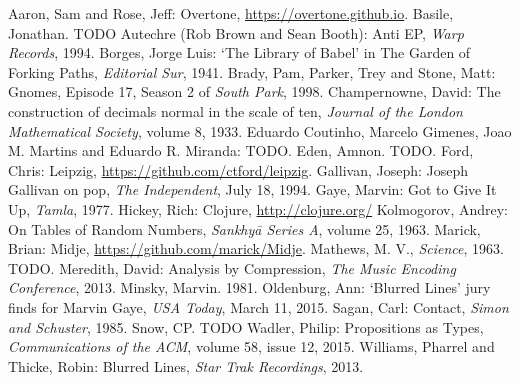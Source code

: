 \documentclass[numbers]{sigplanconf}
\begin{document}
\begin{thebibliography}{}
\softraggedright

 Aaron, Sam and Rose, Jeff: Overtone, \url{https://overtone.github.io}.
 Basile, Jonathan. TODO
 Autechre (Rob Brown and Sean Booth): Anti EP, \textit{Warp Records}, 1994.
 Borges, Jorge Luis: `The Library of Babel' in The Garden of Forking Paths, \textit{Editorial Sur}, 1941.
 Brady, Pam, Parker, Trey and Stone, Matt: Gnomes, Episode 17, Season 2 of \textit{South Park}, 1998.
 Champernowne, David: The construction of decimals normal in the scale of ten, \textit{Journal of the London Mathematical Society}, volume 8, 1933.
 Eduardo Coutinho, Marcelo Gimenes, Joao M. Martins and Eduardo R. Miranda: TODO. 
 Eden, Amnon. TODO.
 Ford, Chris: Leipzig, \url{https://github.com/ctford/leipzig}.
 Gallivan, Joseph: Joseph Gallivan on pop, \textit{The Independent}, July 18, 1994.
 Gaye, Marvin: Got to Give It Up, \textit{Tamla}, 1977.
 Hickey, Rich: Clojure, \url{http://clojure.org/}
  Kolmogorov, Andrey: On Tables of Random Numbers, \textit{Sankhyā Series A}, volume 25, 1963.
 Marick, Brian: Midje, \url{https://github.com/marick/Midje}.
 Mathews, M. V., \textit{Science}, 1963. TODO.
 Meredith, David: Analysis by Compression, \textit{The Music Encoding Conference}, 2013.
 Minsky, Marvin. 1981.
 Oldenburg, Ann: `Blurred Lines' jury finds for Marvin Gaye, \textit{USA Today}, March 11, 2015.
 Sagan, Carl: Contact, \textit{Simon and Schuster}, 1985.
 Snow, CP. TODO
 Wadler, Philip: Propositions as Types, \textit{Communications of the ACM}, volume 58, issue 12, 2015.
 Williams, Pharrel and Thicke, Robin: Blurred Lines, \textit{Star Trak Recordings}, 2013.

\end{thebibliography}
\end{document}
